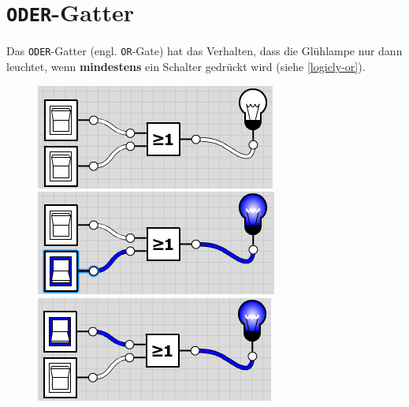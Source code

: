 \vspace{-0.5cm}

\section{\texttt{ODER}-Gatter}

Das \texttt{ODER}-Gatter (engl. \texttt{OR}-Gate) hat das Verhalten, dass die Glühlampe nur dann leuchtet, wenn \textbf{mindestens} ein Schalter gedrückt wird (siehe \autoref{logicly-or}).

\begin{figure}[htb]
\centering
\begin{minipage}{0.225\textwidth}
\includegraphics[width=\textwidth]{./or/or_off_off}
\end{minipage}
\begin{minipage}{0.225\textwidth}
\includegraphics[width=\textwidth]{./or/or_off_on}
\end{minipage}
\begin{minipage}{0.225\textwidth}
\includegraphics[width=\textwidth]{./or/or_on_off}

\end{minipage}
\end{figure}
